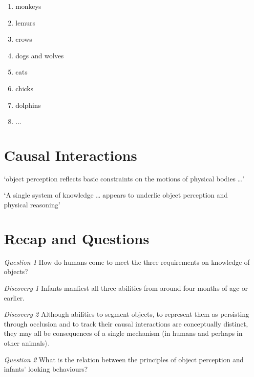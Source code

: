 \documentclass[12pt]{extarticle}
\begin{document}
\begin{multicols}{3}
\begin{enumerate}
\item monkeys \citep{santos:2006_cotton-top}
 
\item lemurs \citep{deppe:2009_object}
 
\item crows \citep{hoffmann:2011_ontogeny}
 
\item dogs and wolves \citep{fiset:2013_object}
 
\item cats \citep{triana:1981_object}
 
\item chicks \citep{chiandetti:2011_chicks_op}
 
\item dolphins \citep{jaakkola:2010_what}
 
\item ...
 
\end{enumerate}
 
 
 
\section{Causal Interactions}
 
‘object perception reflects basic constraints on the motions of physical bodies …’
\citep[p.\ 51]{Spelke:1990jn}
 
‘A single system of knowledge … appears to underlie object perception and physical reasoning’
\citep[p.\ 175]{Carey:1994bh}
 
 
 
\section{Recap and Questions}
 
\emph{Question 1} How do humans come to meet the three requirements on knowledge of objects?
 
\emph{Discovery 1} Infants manfiest all three abilities from around four months of age or earlier.
 
\emph{Discovery 2} Although abilities to segment objects, to represent them as persisting through occlusion and to track their causal interactions are conceptually distinct, they may all be consequences of a single mechanism (in humans and perhaps in other animals).
 
\emph{Question 2} What is the relation between the principles of object perception and infants’ looking behaviours?
 

\end{multicols}
\end{document}
